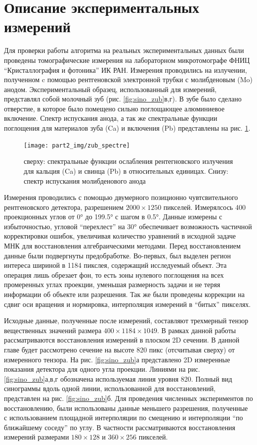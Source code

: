 \section{Описание экспериментальных измерений}
Для проверки работы алгоритма на реальных экспериментальных данных были проведены томографические измерения на лабораторном микротомографе ФНИЦ ``Кристаллография и фотоника'' ИК РАН.
Измерения проводились на излучении, полученном c помощью рентгеновской электронной трубки с молибденовым (Mo) анодом.
Экспериментальный образец, использованный для измерений, представлял собой молочный зуб (рис. \ref{fig:sino_zub}в,г).
В зубе было сделано отверстие, в которое было помещено сильно поглощающее алюминиевое включение.
Спектр испускания анода, а так же спектральные функции поглощения для материалов зуба (Ca) и включения (Pb) представлены на рис. \ref{fig:zub_spectre}.

\begin{figure}
    \centering
    \texttt{[image: part2\_img/zub\_spectre]} \\
    \caption{сверху: спектральные функции ослабления рентегновского излучения для кальция (Ca) и свинца (Pb) в относительных единицах. Снизу: спектр испускания молибденового анода}
    \label{fig:zub_spectre}
\end{figure}

Измерения проводились с помощью двумерного позиционно чувтсвительного рентгеновского детектора, разрешением $2000 \times 1250$ пикселей.
Измерялсось 400 проекционных углов от \ang{0} до \ang{199.5} с шагом в \ang{0.5}.
Данные измерены с избыточностью, угловой ``перехлест'' на \ang{30} обеспечивает возможность частичной корректировки ошибок, увеличивая количество уравнений в исходной задаче МНК для восстановления алгебраическими методами.
Перед восстановлением данные были подвергнуты предобработке.
Во-первых, был выделен регион интереса шириной в 1184 пикслея, содержащий исследуемый объект.
Эта операция лишь обрезает фон, то есть зоны нулевого поглощения на всех промеренных углах проекции, уменьшая размерность задачи и не теряя информации об объекте или разрешения.
Так же были проведены коррекции на сдвиг оси вращения и нормировка, интерполяция измерений в ``битых'' пикселях.

Исходные данные, полученные после измерений, составляют трехмерный тензор вещественных значений размера $400 \times 1184 \times 1049$.
В рамках данной работы рассматриваются восстановления измерений в плоском 2D сечении.
В данной главе будет рассмотрено сечение на высоте 820 пикс (отсчитывая сверху) от измеренного тензора.
На рис. \ref{fig:sino_zub}а представлено 2D измеренные показания детектора для одного угла проекции.
Линиями на рис. \ref{fig:sino_zub}а,в,г обозначена используемая линия уровня 820.
Полный вид синограммы вдоль одной линии, использованной для восстановлений, представлен на рис. \ref{fig:sino_zub}б.
Для проведения численных экспериментов по восстановлению, были использованы данные меньшего разрешения, полученные с использованием площадной интерполяции по смещению и интерполяции ``по ближайшему соседу'' по углу.
В частности рассматриваются восстановления измерений размерами $180 \times 128$ и $360 \times 256$ пикселей.

